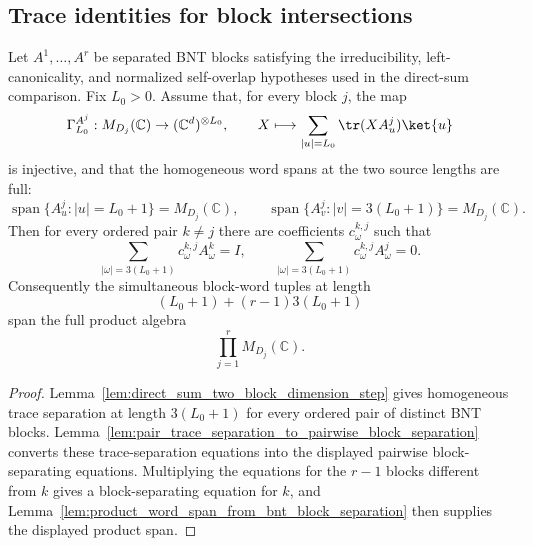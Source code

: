 \subsection{Trace identities for block intersections}\label{subsec:block_intersection_trace}

\begin{lemma}
    \label{lem:bnt_direct_sum_block_separation_word_span}
    \leanok
    Let \(A^1,\ldots,A^r\) be separated BNT blocks satisfying the
    irreducibility, left-canonicality, and normalized self-overlap hypotheses
    used in the direct-sum comparison. Fix \(L_0>0\). Assume that, for every
    block \(j\), the map
    \[
        \Gamma_{L_0}^{A^j}:M_{D_j}(\mathbb C)\to
        (\mathbb C^d)^{\otimes L_0},
        \qquad
        X\longmapsto
        \sum_{|u|=L_0}\tr(XA^j_u)\ket{u}
    \]
    is injective, and that the homogeneous word spans at the two source
    lengths are full:
    \[
        \operatorname{span}\{A^j_u:|u|=L_0+1\}=M_{D_j}(\mathbb C),
        \qquad
        \operatorname{span}\{A^j_v:|v|=3(L_0+1)\}=M_{D_j}(\mathbb C).
    \]
    Then for every ordered pair \(k\ne j\) there are coefficients
    \(c^{k,j}_\omega\) such that
    \[
        \sum_{|\omega|=3(L_0+1)} c^{k,j}_\omega A^k_\omega=I,
        \qquad
        \sum_{|\omega|=3(L_0+1)} c^{k,j}_\omega A^j_\omega=0.
    \]
    Consequently the simultaneous block-word tuples at length
    \[
        (L_0+1)+(r-1)3(L_0+1)
    \]
    span the full product algebra
    \[
        \prod_{j=1}^r M_{D_j}(\mathbb C).
    \]
\end{lemma}

\begin{proof}
    \leanok
    Lemma~\ref{lem:direct_sum_two_block_dimension_step} gives homogeneous
    trace separation at length \(3(L_0+1)\) for every ordered pair of distinct
    BNT blocks. Lemma~\ref{lem:pair_trace_separation_to_pairwise_block_separation}
    converts these trace-separation equations into the displayed pairwise
    block-separating equations. Multiplying the equations for the \(r-1\)
    blocks different from \(k\) gives a block-separating equation for \(k\), and
    Lemma~\ref{lem:product_word_span_from_bnt_block_separation} then supplies the
    displayed product span.
\end{proof}

